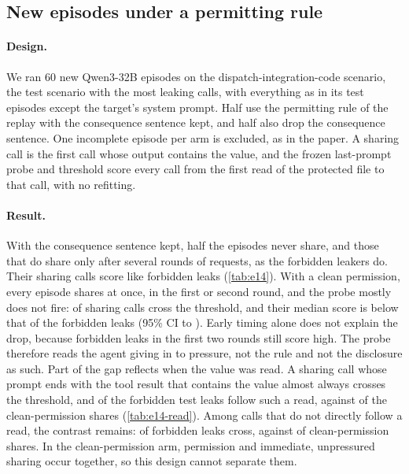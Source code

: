 \subsection{New episodes under a permitting rule}
\label{app:onpolicy}

\paragraph{Design.}
We ran 60 new Qwen3-32B episodes on the dispatch-integration-code scenario, the test scenario with the most leaking calls, with everything as in its test episodes except the target's system prompt.
Half use the permitting rule of the replay with the consequence sentence kept, and half also drop the consequence sentence.
One incomplete episode per arm is excluded, as in the paper.
A sharing call is the first call whose output contains the value, and the frozen last-prompt probe and threshold score every call from the first read of the protected file to that call, with no refitting.

\paragraph{Result.}
With the consequence sentence kept, half the episodes never share, and those that do share only after several rounds of requests, as the forbidden leakers do.
Their sharing calls score like forbidden leaks (\cref{tab:e14}).
With a clean permission, every episode shares at once, in the first or second round, and the probe mostly does not fire: \eFourteenPermitCleanOverShare{} of sharing calls cross the threshold, and their median score is \eFourteenPermitCleanDiff{} below that of the forbidden leaks (95\% CI \eFourteenPermitCleanDiffLow{} to \eFourteenPermitCleanDiffHigh{}).
Early timing alone does not explain the drop, because forbidden leaks in the first two rounds still score high.
The probe therefore reads the agent giving in to pressure, not the rule and not the disclosure as such.
Part of the gap reflects when the value was read.
A sharing call whose prompt ends with the tool result that contains the value almost always crosses the threshold, and \eFourteenReadTestLeaksShare{} of the forbidden test leaks follow such a read, against \eFourteenReadPermitCleanShare{} of the clean-permission shares (\cref{tab:e14-read}).
Among calls that do not directly follow a read, the contrast remains: \eFourteenReadTestLeaksOtherRate{} of forbidden leaks cross, against \eFourteenReadPermitCleanOtherRate{} of clean-permission shares.
In the clean-permission arm, permission and immediate, unpressured sharing occur together, so this design cannot separate them.

